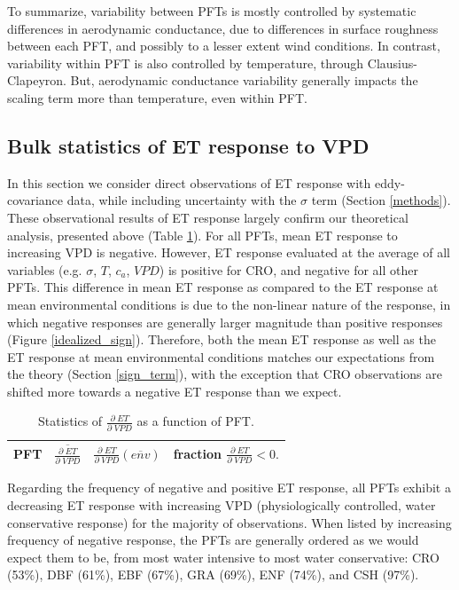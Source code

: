 \documentclass[draft,linenumbers]{agujournal}
\begin{document}
To summarize, variability between PFTs is mostly controlled by systematic differences in aerodynamic conductance, due to differences in surface roughness between each PFT, and possibly to a lesser extent wind conditions. In contrast, variability within PFT is also controlled by temperature, through Clausius-Clapeyron. But, aerodynamic conductance variability generally impacts the scaling term more than temperature, even within PFT.

\subsection{Bulk statistics of ET response to VPD}
\label{stats_sec}

In this section we consider direct observations of ET response with eddy-covariance data, while including uncertainty with the $\sigma$ term (Section \ref{methods}). These observational results of ET response largely confirm our theoretical analysis, presented above (Table \ref{stats}). For all PFTs, mean ET response to increasing VPD is negative. However, ET response evaluated at the average of all variables (e.g. $\sigma$, $T$, $c_a$, $VPD$) is positive for CRO, and negative for all other PFTs. This difference in mean ET response as compared to the ET response at mean environmental conditions is due to the non-linear nature of the response, in which negative responses are generally larger magnitude than positive responses (Figure \ref{idealized_sign}). Therefore, both the mean ET response as well as the ET response at mean environmental conditions matches our expectations from the theory (Section \ref{sign_term}), with the exception that CRO observations are shifted more towards a negative ET response than we expect.

\begin{table}
\caption{Statistics of $\frac{\partial \; ET}{\partial \; VPD}$ as a function of PFT.}
\centering
\begin{tabular}{l c c c}
  \hline
PFT & $\overline{\frac{\partial \; ET}{\partial \; VPD}}$ & $\frac{\partial \; ET}{\partial \; VPD}\left(\overline{env}\right)$ & fraction $\frac{\partial \; ET}{\partial \; VPD} < 0.$ \\
  \hline
  
  \hline
\end{tabular}
  \label{stats}
\end{table}

Regarding the frequency of negative and positive ET response, all PFTs exhibit a  decreasing ET response with increasing VPD (physiologically controlled, water conservative response) for the majority of observations. When listed by increasing frequency of negative response, the PFTs are generally ordered as we would expect them to be, from most water intensive to most water conservative: CRO (53\%), DBF (61\%), EBF (67\%), GRA (69\%), ENF (74\%), and CSH (97\%). 
\end{document}

